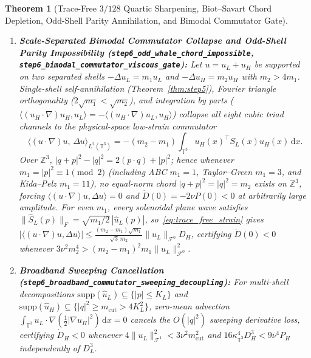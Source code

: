 \documentclass[11pt]{article}
\theoremstyle{plain}
\newtheorem{theorem}{Theorem}[section]
\theoremstyle{definition}
\begin{document}
\begin{theorem}[Trace-Free $3/128$ Quartic Sharpening, Biot--Savart Chord Depletion, Odd-Shell Parity Annihilation, and Bimodal Commutator Gate]
\begin{enumerate}
  \begin{equation}\label{eq:cf_chord}
    \bigl(\det[\xi, \eta, z]\bigr)^2 \le |z|^2\,R\,|\xi - \eta|^2.
  \end{equation}
  \item \textbf{Scale-Separated Bimodal Commutator Collapse and Odd-Shell Parity Impossibility (\texttt{step6\_odd\_whale\_chord\_impossible}, \texttt{step6\_bimodal\_commutator\_viscous\_gate}):} Let $u = u_L + u_H$ be supported on two separated shells $-\Delta u_L = m_1 u_L$ and $-\Delta u_H = m_2 u_H$ with $m_2 > 4 m_1$. Single-shell self-annihilation (Theorem~\ref{thm:step5}), Fourier triangle orthogonality ($2\sqrt{m_1} < \sqrt{m_2}$), and integration by parts ($\langle (u_H\cdot\nabla)u_H, u_L\rangle = -\langle (u_H\cdot\nabla)u_L, u_H\rangle$) collapse all eight cubic triad channels to the physical-space low-strain commutator
  \begin{equation}\label{eq:bimodal_commutator}
    \langle (u\cdot\nabla)u, \, \Delta u\rangle_{L^2(\mathbb{T}^3)} = -(m_2 - m_1) \int_{\mathbb{T}^3} u_H(x)^\top S_L(x) u_H(x)\,\mathrm{d}x.
  \end{equation}
  Over $\mathbb{Z}^3$, $|q + p|^2 - |q|^2 = 2(p\cdot q) + |p|^2$; hence whenever $m_1 = |p|^2 \equiv 1 \pmod 2$ (including ABC $m_1 = 1$, Taylor--Green $m_1 = 3$, and Kida--Pelz $m_1 = 11$), \emph{no} equal-norm chord $|q + p|^2 = |q|^2 = m_2$ exists on $\mathbb{Z}^3$, forcing $\langle (u\cdot\nabla)u, \Delta u\rangle = 0$ and $\dot{D}(0) = -2\nu P(0) < 0$ at \emph{arbitrarily large amplitude}. For even $m_1$, every solenoidal plane wave satisfies $\|\widehat{S}_L(p)\|_F = \sqrt{m_1/2}\,|\hat{u}_L(p)|$, so~\eqref{eq:trace_free_strain} gives $|\langle (u\cdot\nabla)u, \Delta u\rangle| \le \frac{(m_2 - m_1)\sqrt{m_1}}{\sqrt{3}\,m_2}\|u_L\|_{\mathcal{F}^0} D_H$, certifying $\dot{D}(0) < 0$ whenever $3\nu^2 m_2^4 > (m_2 - m_1)^2 m_1 \|u_L\|_{\mathcal{F}^0}^2$.
  \item \textbf{Broadband Sweeping Cancellation (\texttt{step6\_broadband\_commutator\_sweeping\_\allowbreak decoupling}):} For multi-shell decompositions $\mathrm{supp}(\hat{u}_L) \subseteq \{|p| \le K_L\}$ and $\mathrm{supp}(\hat{u}_H) \subseteq \{|q|^2 \ge m_{\mathrm{cut}} > 4 K_L^2\}$, zero-mean advection $\int_{\mathbb{T}^3} u_L \cdot \nabla(\frac{1}{2}|\nabla u_H|^2)\,\mathrm{d}x = 0$ cancels the $O(|q|^2)$ sweeping derivative loss, certifying $\dot{D}_H < 0$ whenever $4\|u_L\|_{\mathcal{F}^1}^2 < 3\nu^2 m_{\mathrm{cut}}^2$ and $16\kappa_{\mathbb{T}^3}^4 D_H^3 < 9\nu^4 P_H$ independently of $D_L^3$.
\end{enumerate}
\end{theorem}
\end{document}

